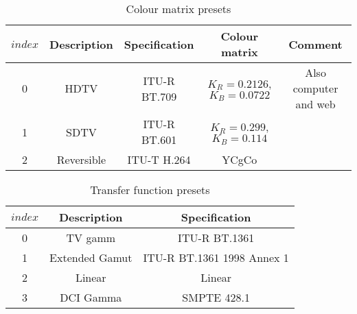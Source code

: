 \begin{table}[!ht]
\centering
\begin{tabular}{|c|c|c|c|c|}
\hline
$index$ &  {\bf Description} & {\bf Specification} & {\bf Colour matrix} & {\bf Comment}\\
\hline
0 & HDTV & ITU-R BT.709 & $K_R=0.2126$, $K_B=0.0722$ & Also computer and web\\ 
\hline
1 & SDTV & ITU-R BT.601 & $K_R=0.299$, $K_B=0.114$ & \\
\hline
2 & Reversible & ITU-T H.264 & YCgCo & \\
\hline
\end{tabular}
\caption{Colour matrix presets}\label{table:matrixvalues}
\end{table}

\begin{table}[!ht]
\centering
\begin{tabular}{|c|c|c|}
\hline
$index$ & {\bf Description} & {\bf Specification}\\
\hline
0 & TV gamm & ITU-R BT.1361\\ 
\hline
1 & Extended Gamut & ITU-R BT.1361 1998 Annex 1\\
\hline
2 & Linear & Linear\\
\hline
3 & DCI Gamma & SMPTE 428.1\\
\hline
\end{tabular}
\caption{Transfer function presets}\label{table:transfervalues}
\end{table}
